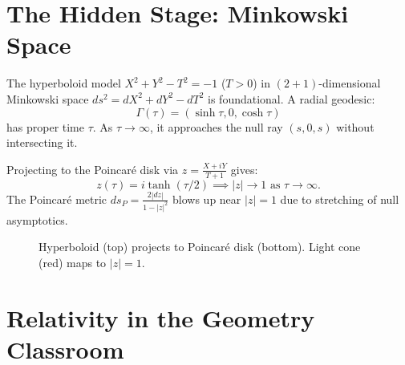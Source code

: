 \documentclass[10pt]{article}
\begin{document}
\section{The Hidden Stage: Minkowski Space}

The hyperboloid model $X^2 + Y^2 - T^2 = -1$ ($T > 0$) in $(2+1)$-dimensional Minkowski space $ds^2 = dX^2 + dY^2 - dT^2$ is foundational. A radial geodesic:
\begin{equation*}
\Gamma(\tau) = (\sinh\tau, 0, \cosh\tau)
\end{equation*}
has proper time $\tau$. As $\tau \to \infty$, it approaches the null ray $(s, 0, s)$ without intersecting it.

Projecting to the Poincaré disk via $z = \frac{X + iY}{T + 1}$ gives:
\begin{equation*}
z(\tau) = i \tanh(\tau/2) \implies |z| \to 1 \text{ as } \tau \to \infty.
\end{equation*}
The Poincaré metric $ds_P = \frac{2|dz|}{1 - |z|^2}$ blows up near $|z|=1$ due to stretching of null asymptotics.

\begin{figure}[H]
\centering
{}
\caption{Hyperboloid (top) projects to Poincaré disk (bottom). Light cone (red) maps to $|z|=1$.}
\label{fig:projection}
\end{figure}

\section{Relativity in the Geometry Classroom}
\end{document}
